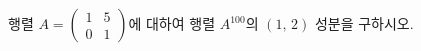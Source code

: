 \hspace*{2mm}\begin{minipage}[t]{\dimexpr\linewidth-2mm\relax}\vspace{0pt}
행렬 $A=\begin{pmatrix} 1 & 5 \\ 0 & 1 \end{pmatrix}$에 대하여 행렬 $A^{100}$의 $(1,\,2)$ 성분을 구하시오.\end{minipage}
